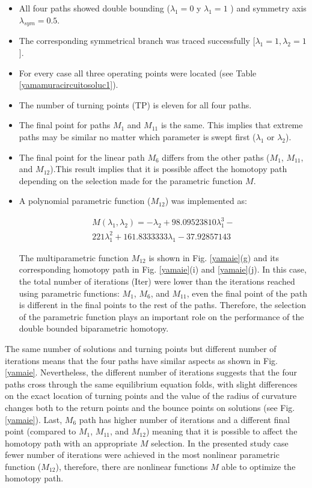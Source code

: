 \documentclass[conference,letterpaper,twocolumn]{IEEEtran}
\begin{document}
\begin{itemize}
\item All four paths showed double bounding ($\lambda_1=0$ y $\lambda_1=1$ ) and symmetry axis $\lambda_{sym}=0.5$.
\item The corresponding symmetrical branch was traced successfully [$\lambda_1=1,\lambda_2=1$].
\item For every case all three operating points were located (see Table \ref{yamamuracircuitosoluc1}).
\item The number of turning points (TP) is eleven for all four paths.
\item The final point for paths $M_1$ and $M_{11}$ is the same. This implies that extreme paths may be similar no matter which parameter is swept first ($\lambda_1$ or $\lambda_2$).
\item The final point for the linear path $M_{6}$ differs from the other paths ($M_1$, $M_11$, and $M_{12}$).This result implies that it is possible affect the homotopy path depending on the selection made for the parametric function $M$.
\item A polynomial parametric function ($M_{12}$) was implemented as:

{\small
\begin{displaymath}
\begin{array}{c}
M(\lambda_1,\lambda_2)=-\lambda_2+ 98.09523810\lambda_1^3- \\ 221\lambda_1^2+ 161.8333333\lambda_1-37.92857143
\end{array}
\end{displaymath}
}

The multiparametric function $M_{12}$ is shown in Fig. \ref{yamaie}(g) and its corresponding homotopy path in Fig. \ref{yamaie}(i) and \ref{yamaie}(j). In this case, the total number of iterations (Iter) were lower than the iterations reached using parametric functions: $M_1$, $M_6$, and $M_{11}$,  even the final point of the path is different in the final points to the rest of the paths. Therefore, the selection of the parametric function plays an important role on the performance of the double bounded biparametric homotopy.
\end{itemize}

The same number of solutions and turning points but different number of iterations means that the four paths have similar aspects as shown in Fig. \ref{yamaie}. Nevertheless, the different number of iterations suggests that the four paths cross through the same equilibrium equation folds, with slight differences on the exact location of turning points and the value of the radius of curvature changes both to the return points and the bounce points on solutions (see Fig. \ref{yamaie}). Last, $M_6$ path has higher number of iterations and a different final point (compared to $M_1$, $M_{11}$, and $M_{12}$) meaning that it is possible to affect the homotopy path with an appropriate $M$ selection. In the presented study case fewer number of iterations were achieved in the most nonlinear parametric function ($M_{12}$), therefore, there are nonlinear functions $M$ able to optimize the homotopy path.
\end{document}
